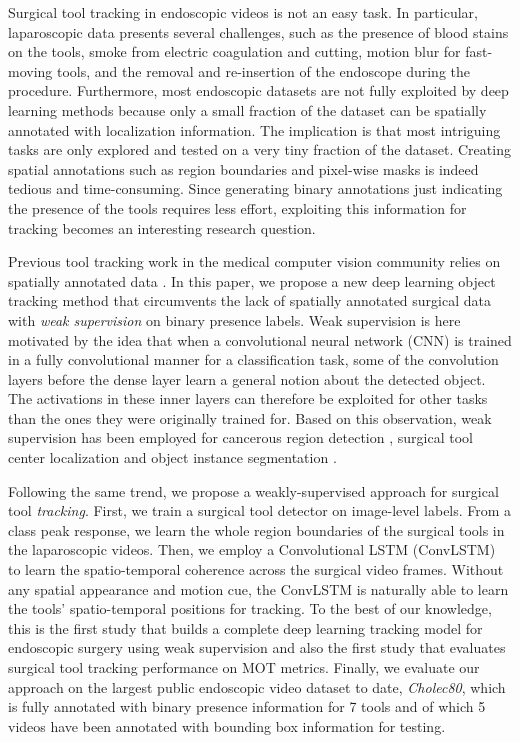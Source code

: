 \documentclass{svjour3}                     \smartqed
\begin{document}
Surgical tool tracking in endoscopic videos is not an easy task. 
In particular, laparoscopic data presents several challenges, such as the presence of blood stains on the tools, smoke from electric coagulation and cutting, motion blur for fast-moving tools, and the removal and re-insertion of the endoscope during the procedure. 
Furthermore, most endoscopic datasets are not fully exploited by deep learning methods because only a small fraction of the dataset can be spatially annotated with localization information. 
The implication is that most intriguing tasks are only explored and tested on a very tiny fraction of the dataset.
Creating spatial annotations such as region boundaries and pixel-wise masks is indeed tedious and time-consuming.
Since generating binary annotations just indicating the presence of the tools requires less effort, exploiting this information for tracking becomes an interesting research question.

Previous tool tracking work in the medical computer vision community relies on spatially annotated data \cite{ipcai:richa2011visual,miccai:sznitman2011unified}.
In this paper, we propose a new deep learning object tracking method that circumvents the lack of spatially annotated surgical data with \textit{weak supervision} on binary presence labels. 
Weak supervision is here motivated by the idea that when a convolutional neural network (CNN) is trained in a fully convolutional manner for a classification task, some of the convolution layers before the dense layer learn a general notion about the detected object. 
The activations in these inner layers can therefore be exploited for other tasks than the ones they were originally trained for. 
Based on this observation, weak supervision has been employed for cancerous region detection \cite{miccai:hwang2016self,ieee:jia2017constrained}, surgical tool center localization \cite{miccai:vardazaryan2018weakly} and object instance segmentation \cite{arXiv:zhou2018weakly}. 

Following the same trend, we propose a weakly-supervised approach for surgical tool {\it tracking}. First, we train a surgical tool detector on image-level labels.
From a class peak response, we learn the whole region boundaries of the surgical tools in the laparoscopic videos.
Then, we employ a Convolutional LSTM (ConvLSTM) to learn the spatio-temporal coherence across the surgical video frames. 
Without any spatial appearance and motion cue, the ConvLSTM is naturally able to learn the tools' spatio-temporal positions for tracking.
To the best of our knowledge, this is the first study that builds a complete deep learning tracking model for endoscopic surgery using weak supervision and also the first study that evaluates surgical tool tracking performance on MOT metrics.
Finally, we evaluate our approach on the largest public endoscopic video dataset to date, \emph{Cholec80}, which is fully annotated with binary presence information for 7 tools and of which 5 videos have been annotated with bounding box information for testing.
\end{document}
